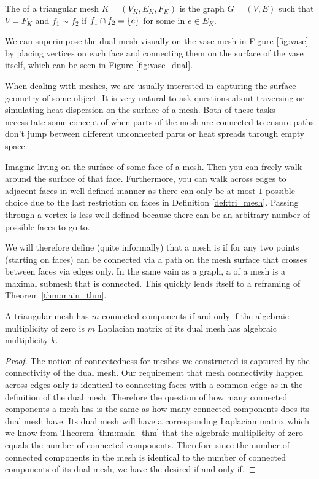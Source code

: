 \documentclass[11pt]{article}
\begin{document}
\begin{definition}
    The  of a triangular mesh $K = (V_K, E_K, F_K)$ is the graph $G = (V, E)$ such that $V = F_K$ and $f_1 \sim f_2$ if $f_1 \cap f_2 = \qty{e}$ for some in $e \in E_K$.
\end{definition}

\begin{example}
    We can superimpose the dual mesh visually on the vase mesh in Figure \ref{fig:vase} by placing vertices on each face and connecting them on the surface of the vase itself, which can be seen in Figure \ref{fig:vase_dual}.
\end{example}

When dealing with meshes, we are usually interested in capturing the surface geometry of some object. It is very natural to ask questions about traversing or simulating heat dispersion on the surface of a mesh. Both of these tasks necessitate some concept of when parts of the mesh are connected to ensure paths don't jump between different unconnected parts or heat spreads through empty space. 

Imagine living on the surface of some face of a mesh. Then you can freely walk around the surface of that face. Furthermore, you can walk across edges to adjacent faces in well defined manner as there can only be at most $1$ possible choice due to the last restriction on faces in Definition \ref{def:tri_mesh}. Passing through a vertex is less well defined because there can be an arbitrary number of possible faces to go to.

We will therefore define (quite informally) that a mesh is  if for any two points (starting on faces) can be connected via a path on the mesh surface that crosses between faces via edges only. In the same vain as a graph, a  of a mesh is a maximal submesh that is connected. This quickly lends itself to a reframing of Theorem \ref{thm:main_thm}.

\begin{theorem}
    A triangular mesh has $m$ connected components if and only if the algebraic multiplicity of zero is $m$ Laplacian matrix of its dual mesh has algebraic multiplicity $k$.
\end{theorem}

\begin{proof}
    The notion of connectedness for meshes we constructed is captured by the connectivity of the dual mesh. Our requirement that mesh connectivity happen across edges only is identical to connecting faces with a common edge as in the definition of the dual mesh. Therefore the question of how many connected components a mesh has is the same as how many connected components does its dual mesh have. Its dual mesh will have a corresponding Laplacian matrix which we know from Theorem \ref{thm:main_thm} that the algebraic multiplicity of zero equals the number of connected components. Therefore since the number of connected components in the mesh is identical to the number of connected components of its dual mesh, we have the desired if and only if.
\end{proof}
\end{document}
